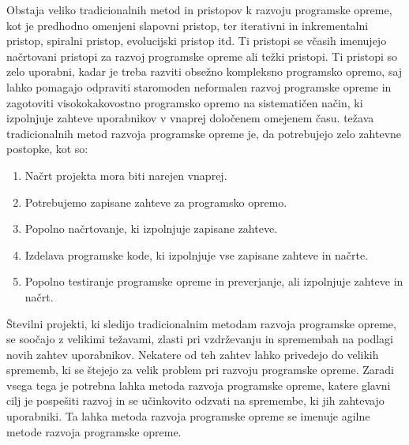 \documentclass[a4paper,12pt,openright]{book}
\begin{document}
Obstaja veliko tradicionalnih metod in pristopov k razvoju programske opreme, kot je predhodno omenjeni slapovni pristop, ter iterativni in inkrementalni pristop, spiralni pristop, evolucijski pristop itd. Ti pristopi se včasih imenujejo načrtovani pristopi za razvoj programske opreme ali težki pristopi.  Ti pristopi so zelo uporabni, kadar je treba razviti obsežno kompleksno programsko opremo, saj lahko pomagajo odpraviti staromoden neformalen razvoj programske opreme in zagotoviti visokokakovostno programsko opremo na sistematičen način, ki izpolnjuje zahteve uporabnikov v vnaprej določenem omejenem času. težava tradicionalnih metod razvoja programske opreme je, da potrebujejo zelo zahtevne postopke, kot so: 
\begin{enumerate}
    \item Načrt projekta mora biti narejen vnaprej. 
    \item Potrebujemo zapisane zahteve za programsko opremo.
    \item Popolno načrtovanje, ki izpolnjuje zapisane zahteve.
    \item Izdelava programske kode, ki izpolnjuje vse zapisane zahteve in načrte.
    \item Popolno testiranje programske opreme in preverjanje, ali izpolnjuje zahteve in načrt.
\end{enumerate}
Številni projekti, ki sledijo tradicionalnim metodam razvoja programske opreme, se soočajo z velikimi težavami, zlasti pri vzdrževanju in spremembah na podlagi novih zahtev uporabnikov. Nekatere od teh zahtev lahko privedejo do velikih sprememb, ki se štejejo za velik problem pri razvoju programske opreme.  Zaradi vsega tega je potrebna lahka metoda razvoja programske opreme, katere glavni cilj je pospešiti razvoj in se učinkovito odzvati na spremembe, ki jih zahtevajo uporabniki.  Ta lahka metoda razvoja programske opreme se imenuje agilne metode razvoja programske opreme. 
\cite{AlSaqqa2020AgileSD}
\end{document}
